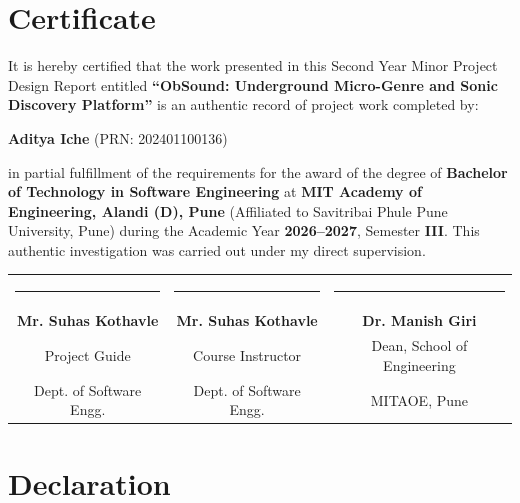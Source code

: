 \documentclass[12pt,a4paper,oneside]{report}
\begin{document}
\setcounter{page}{2}

\chapter*{Certificate}

\noindent It is hereby certified that the work presented in this Second Year Minor Project Design Report entitled \textbf{``ObSound: Underground Micro-Genre and Sonic Discovery Platform''} is an authentic record of project work completed by:

\begin{center}
\textbf{Aditya Iche} \quad (PRN: 202401100136)
\end{center}

\noindent in partial fulfillment of the requirements for the award of the degree of \textbf{Bachelor of Technology in Software Engineering} at \textbf{MIT Academy of Engineering, Alandi (D), Pune} (Affiliated to Savitribai Phule Pune University, Pune) during the Academic Year \textbf{2026--2027}, Semester \textbf{III}. This authentic investigation was carried out under my direct supervision.

\vspace{2.5cm}

\noindent
\begin{tabular*}{\textwidth}{@{\extracolsep{\fill}}ccc}
\rule{4.5cm}{0.4pt} & \rule{4.5cm}{0.4pt} & \rule{4.5cm}{0.4pt} \\
\textbf{Mr. Suhas Kothavle} & \textbf{Mr. Suhas Kothavle} & \textbf{Dr. Manish Giri} \\
Project Guide & Course Instructor & Dean, School of Engineering \\
Dept. of Software Engg. & Dept. of Software Engg. & MITAOE, Pune \\
\end{tabular*}

\clearpage

\chapter*{Declaration}
\end{document}
